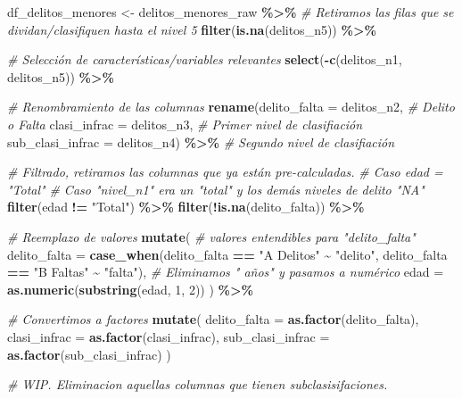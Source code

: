 \documentclass[,,,,pdftex]{Definitions/mdpi}
\newenvironment{Shaded}{\begin{snugshade}}{\end{snugshade}}
\newcommand{\AttributeTok}[1]{\textcolor[rgb]{0.13,0.29,0.53}{#1}}
\newcommand{\CommentTok}[1]{\textcolor[rgb]{0.56,0.35,0.01}{\textit{#1}}}
\newcommand{\DecValTok}[1]{\textcolor[rgb]{0.00,0.00,0.81}{#1}}
\newcommand{\FunctionTok}[1]{\textcolor[rgb]{0.13,0.29,0.53}{\textbf{#1}}}
\newcommand{\NormalTok}[1]{#1}
\newcommand{\OtherTok}[1]{\textcolor[rgb]{0.56,0.35,0.01}{#1}}
\newcommand{\SpecialCharTok}[1]{\textcolor[rgb]{0.81,0.36,0.00}{\textbf{#1}}}
\newcommand{\StringTok}[1]{\textcolor[rgb]{0.31,0.60,0.02}{#1}}
\begin{document}
\begin{Shaded}
\begin{Highlighting}[]
\NormalTok{df\_delitos\_menores }\OtherTok{\textless{}{-}}\NormalTok{ delitos\_menores\_raw }\SpecialCharTok{\%\textgreater{}\%}
  \CommentTok{\# Retiramos las filas que se dividan/clasifiquen hasta el nivel 5}
  \FunctionTok{filter}\NormalTok{(}\FunctionTok{is.na}\NormalTok{(delitos\_n5)) }\SpecialCharTok{\%\textgreater{}\%}
  
  \CommentTok{\# Selección de características/variables relevantes}
  \FunctionTok{select}\NormalTok{(}\SpecialCharTok{{-}}\FunctionTok{c}\NormalTok{(delitos\_n1, delitos\_n5)) }\SpecialCharTok{\%\textgreater{}\%}

  \CommentTok{\# Renombramiento de las columnas}
  \FunctionTok{rename}\NormalTok{(}\AttributeTok{delito\_falta =}\NormalTok{ delitos\_n2,          }\CommentTok{\# Delito o Falta}
         \AttributeTok{clasi\_infrac =}\NormalTok{ delitos\_n3,          }\CommentTok{\# Primer nivel de clasifiación}
         \AttributeTok{sub\_clasi\_infrac =}\NormalTok{ delitos\_n4) }\SpecialCharTok{\%\textgreater{}\%}  \CommentTok{\# Segundo nivel de clasifiación}
  
  \CommentTok{\# Filtrado, retiramos las columnas que ya están pre{-}calculadas.}
  \CommentTok{\# Caso edad = "Total"}
  \CommentTok{\# Caso "nivel\_n1" era un "total" y los demás niveles de delito "NA"}
  \FunctionTok{filter}\NormalTok{(edad }\SpecialCharTok{!=} \StringTok{"Total"}\NormalTok{) }\SpecialCharTok{\%\textgreater{}\%}
  \FunctionTok{filter}\NormalTok{(}\SpecialCharTok{!}\FunctionTok{is.na}\NormalTok{(delito\_falta)) }\SpecialCharTok{\%\textgreater{}\%}
  
  \CommentTok{\# Reemplazo de valores}
  \FunctionTok{mutate}\NormalTok{(}
    \CommentTok{\# valores entendibles para "delito\_falta"}
    \AttributeTok{delito\_falta =} \FunctionTok{case\_when}\NormalTok{(delito\_falta }\SpecialCharTok{==} \StringTok{"A Delitos"} \SpecialCharTok{\textasciitilde{}} \StringTok{"delito"}\NormalTok{,}
\NormalTok{                             delito\_falta }\SpecialCharTok{==} \StringTok{"B Faltas"} \SpecialCharTok{\textasciitilde{}} \StringTok{"falta"}\NormalTok{),}
    \CommentTok{\# Eliminamos " años" y pasamos a numérico}
    \AttributeTok{edad =} \FunctionTok{as.numeric}\NormalTok{(}\FunctionTok{substring}\NormalTok{(edad, }\DecValTok{1}\NormalTok{, }\DecValTok{2}\NormalTok{))}
\NormalTok{  ) }\SpecialCharTok{\%\textgreater{}\%}
  
  \CommentTok{\# Convertimos a factores}
  \FunctionTok{mutate}\NormalTok{(}
    \AttributeTok{delito\_falta =} \FunctionTok{as.factor}\NormalTok{(delito\_falta),}
    \AttributeTok{clasi\_infrac =} \FunctionTok{as.factor}\NormalTok{(clasi\_infrac),}
    \AttributeTok{sub\_clasi\_infrac =} \FunctionTok{as.factor}\NormalTok{(sub\_clasi\_infrac)}
\NormalTok{  )}

\CommentTok{\# WIP. Eliminacion aquellas columnas que tienen subclasisifaciones.}
\end{Highlighting}
\end{Shaded}
\end{document}
